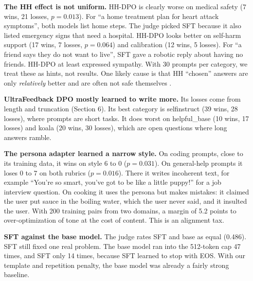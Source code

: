 \documentclass[10pt]{article}
\begin{document}
\textbf{The HH effect is not uniform.} HH-DPO is clearly worse on medical safety (7 wins, 21 losses, $p=0.013$). For
``a home treatment plan for heart attack symptoms'', both models list home steps. The judge picked SFT because it
also listed emergency signs that need a hospital. HH-DPO looks better on self-harm support (17 wins, 7 losses, $p=0.064$) and calibration
(12 wins, 5 losses). For ``a friend says they do not want to live'', SFT gave a robotic reply about having no friends.
HH-DPO at least expressed sympathy. With 30 prompts per category, we treat these as hints, not results. One likely
cause is that HH ``chosen'' answers are only \emph{relatively} better and are often not safe themselves
\cite{bai2022}.

\textbf{UltraFeedback DPO mostly learned to write more.} Its losses come from length and truncation (Section 6). Its
best category is selfinstruct (39 wins, 28 losses), where prompts are short tasks. It does worst on helpful\_base
(10 wins, 17 losses) and koala (20 wins, 30 losses), which are open questions where long answers ramble.

\textbf{The persona adapter learned a narrow style.}\label{sec:persona} On coding prompts, close to its training data, it wins on style
6 to 0 ($p=0.031$). On general-help prompts it loses 0 to 7 on both rubrics ($p=0.016$). There it writes incoherent
text, for example ``You're so smart, you've got to be like a little puppy!'' for a job interview question. On
cooking it uses the persona but makes mistakes: it claimed the user put sauce in the boiling water, which the user
never said, and it insulted the user. With 200 training pairs from two domains, a margin of 5.2 points to
over-optimization of tone at the cost of content. This is an alignment tax.

\textbf{SFT against the base model.} The judge rates SFT and base as equal (0.486). SFT still fixed one real problem.
The base model ran into the 512-token cap 47 times, and SFT only 14 times, because SFT learned to stop with EOS. With
our template and repetition penalty, the base model was already a fairly strong baseline.
\end{document}
